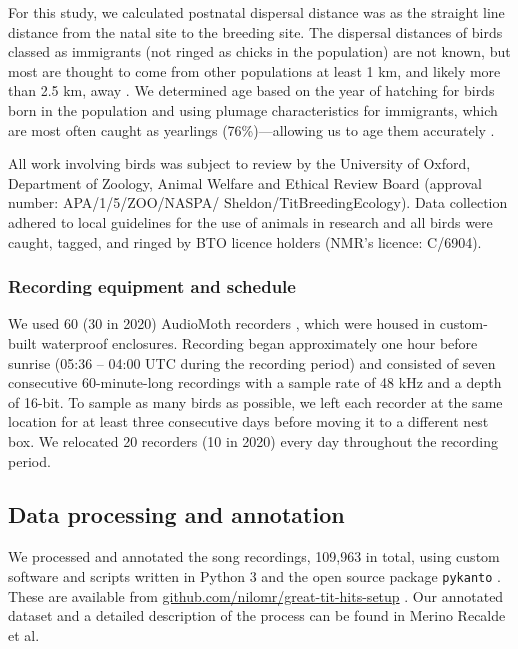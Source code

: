 \documentclass[9pt, onecolumn, twoside, lineno]{gsajnl}
\begin{document}
For this study, we calculated postnatal dispersal distance was as the straight line distance from the natal site to the breeding site. The dispersal distances of birds classed as immigrants (not ringed as chicks in the population) are not known, but most are thought to come from other populations at least 1 km, and likely more than 2.5 km, away \autocite{verhulst1997, quinn2011}. We determined age based on the year of hatching for birds born in the population and using plumage characteristics for immigrants, which are most often caught as yearlings (76\%)---allowing us to age them accurately \autocite{woodman2023}.

All work involving birds was subject to review by the University of Oxford, Department of Zoology, Animal Welfare and Ethical Review Board (approval number: APA/1/5/ZOO/NASPA/ Sheldon/TitBreedingEcology). Data collection adhered to local guidelines for the use of animals in research and all birds were caught, tagged, and ringed by BTO licence holders (NMR's licence: C/6904).

\subsubsection{Recording equipment and schedule}
We used 60 (30 in 2020) AudioMoth recorders \autocite{hill2019}, which were housed in custom-built waterproof enclosures. Recording began approximately one hour before sunrise (05:36 -- 04:00 UTC during the recording period) and consisted of seven consecutive 60-minute-long recordings with a sample rate of 48 kHz and a depth of 16-bit. To sample as many birds as possible, we left each recorder at the same location for at least three consecutive days before moving it to a different nest box. We relocated 20 recorders (10 in 2020) every day throughout the recording period.

\subsection{Data processing and annotation}

We processed and annotated the song recordings, 109,963 in total, using custom software and scripts written in Python 3 \autocite{vanrossum1995} and the open source package \texttt{pykanto} \autocite{merinorecalde2023}. These are available from \href{https://github.com/nilomr/great-tit-hits-setup}{github.com/nilomr/great-tit-hits-setup} \autocite{nilo_gretidataset_setup_2023}. Our annotated dataset and a detailed description of the process can be found in Merino Recalde et al\autocite{merinorecalde2023a}. 
\end{document}
